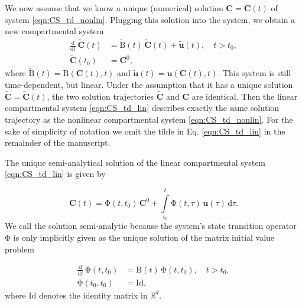 \documentclass[11pt,a4paper]{article}
\renewcommand{\vec}[1]{\mathbf{#1}}
\newcommand{\tens}[1]{\mathrm{#1}}
\newcommand{\id}{\tens{Id}}
\newcommand{\deriv}[1]{\frac{\mathrm{d}}{\mathrm{d}#1}}
\newcommand{\dd}[1]{\,\mathrm{d}#1}
\newcommand{\intl}{\int\limits}
\newcommand{\R}{\mathbb{R}}
\begin{document}
    We now assume that we know a unique (numerical) solution $\vec{C}=\vec{C}(t)$ of system \eqref{eqn:CS_td_nonlin}.
    Plugging this solution into the system, we obtain a new compartmental system
    \begin{equation}\label{eqn:CS_td_lin}
        \begin{aligned}
            \deriv{t}\,\widetilde{\vec{C}}(t) &= \widetilde{\tens{B}}(t)\,\widetilde{\vec{C}}(t) + \widetilde{\vec{u}}(t),\quad t>t_0,\\
            \widetilde{\vec{C}}(t_0) &= \vec{C}^0,
        \end{aligned}
    \end{equation}
    where $\widetilde{\tens{B}}(t)=\tens{B}(\vec{C}(t),t)$ and $\widetilde{\vec{u}}(t)=\vec{u}(\vec{C}(t),t)$.
    This system is still time-dependent, but linear.
    Under the assumption that it has a unique solution $\widetilde{\vec{C}}=\widetilde{\vec{C}}(t)$, the two solution trajectories $\widetilde{\vec{C}}$ and $\vec{C}$ are identical.
    Then the linear compartmental system \eqref{eqn:CS_td_lin} describes exactly the same solution trajectory as the nonlinear compartmental system \eqref{eqn:CS_td_nonlin}.
    For the sake of simplicity of notation we omit the tilde in Eq. \eqref{eqn:CS_td_lin} in the remainder of the manuscript.
    
    The unique semi-analytical solution of the linear compartmental system \eqref{eqn:CS_td_lin} is given by \citep{Brockett2015}
    
    \begin{equation*}
        \vec{C}(t) = \tens{\Phi}(t,t_0)\,\vec{C}^0 + \intl_{t_0}^t \tens{\Phi}(t,\tau)\,\vec{u}(\tau)\dd{\tau}.
    \end{equation*}
    We call the solution semi-analytic because the system's state transition operator $\tens{\Phi}$ is only implicitly given as the unique solution of the matrix initial value problem
    
    \begin{equation*}
        \begin{aligned}
            \deriv{t}\,\tens{\Phi}(t,t_0) &= \tens{B}(t)\,\tens{\Phi}(t,t_0),\quad t>t_0,\\
            \tens{\Phi}(t_0,t_0) &= \id,
        \end{aligned}
    \end{equation*}
    where $\id$ denotes the identity matrix in $\R^d$. 
\end{document}
